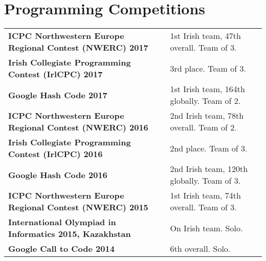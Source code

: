\documentclass[a4paper, oneside, final]{scrartcl}
\begin{document}
\section{Programming Competitions}
\begin{tabularx}{\columnwidth}{@{}XT@{}}
\textbf{ICPC Northwestern Europe Regional Contest (NWERC) 2017}&1st Irish team, 47th overall. Team of 3.\\
\textbf{Irish Collegiate Programming Contest (IrlCPC) 2017}&3rd place. Team of 3.\\
\textbf{Google Hash Code 2017}&1st Irish team, 164th globally. Team of 2.\\
\textbf{ICPC Northwestern Europe Regional Contest (NWERC) 2016}&2nd Irish team, 78th overall. Team of 2.\\
\textbf{Irish Collegiate Programming Contest (IrlCPC) 2016}&2nd place. Team of 3.\\
\textbf{Google Hash Code 2016}&2nd Irish team, 120th globally. Team of 3.\\
\textbf{ICPC Northwestern Europe Regional Contest (NWERC) 2015}&1st Irish team, 74th overall. Team of 3.\\
\textbf{International Olympiad in Informatics 2015, Kazakhstan}&On Irish team. Solo.\\
\textbf{Google Call to Code 2014}&6th overall. Solo.
\end{tabularx}
\end{document}
